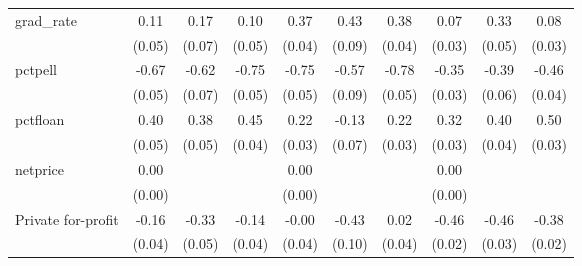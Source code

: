 \begin{table}[htbp]
\begin{adjustbox}{center}
\begin{tabular}{l*{9}{c}}
grad\_rate           &        0.11\sym{**} &        0.17\sym{**} &        0.10\sym{*}  &        0.37\sym{***}&        0.43\sym{***}&        0.38\sym{***}&        0.07\sym{**} &        0.33\sym{***}&        0.08\sym{***}\\
                    &      (0.05)         &      (0.07)         &      (0.05)         &      (0.04)         &      (0.09)         &      (0.04)         &      (0.03)         &      (0.05)         &      (0.03)         \\
pctpell             &       -0.67\sym{***}&       -0.62\sym{***}&       -0.75\sym{***}&       -0.75\sym{***}&       -0.57\sym{***}&       -0.78\sym{***}&       -0.35\sym{***}&       -0.39\sym{***}&       -0.46\sym{***}\\
                    &      (0.05)         &      (0.07)         &      (0.05)         &      (0.05)         &      (0.09)         &      (0.05)         &      (0.03)         &      (0.06)         &      (0.04)         \\
pctfloan            &        0.40\sym{***}&        0.38\sym{***}&        0.45\sym{***}&        0.22\sym{***}&       -0.13\sym{*}  &        0.22\sym{***}&        0.32\sym{***}&        0.40\sym{***}&        0.50\sym{***}\\
                    &      (0.05)         &      (0.05)         &      (0.04)         &      (0.03)         &      (0.07)         &      (0.03)         &      (0.03)         &      (0.04)         &      (0.03)         \\
netprice            &        0.00\sym{**} &                     &                     &        0.00         &                     &                     &        0.00\sym{***}&                     &                     \\
                    &      (0.00)         &                     &                     &      (0.00)         &                     &                     &      (0.00)         &                     &                     \\
Private for-profit  &       -0.16\sym{***}&       -0.33\sym{***}&       -0.14\sym{***}&       -0.00         &       -0.43\sym{***}&        0.02         &       -0.46\sym{***}&       -0.46\sym{***}&       -0.38\sym{***}\\
                    &      (0.04)         &      (0.05)         &      (0.04)         &      (0.04)         &      (0.10)         &      (0.04)         &      (0.02)         &      (0.03)         &      (0.02)         \\

\end{tabular}
\end{adjustbox}
\end{table}

